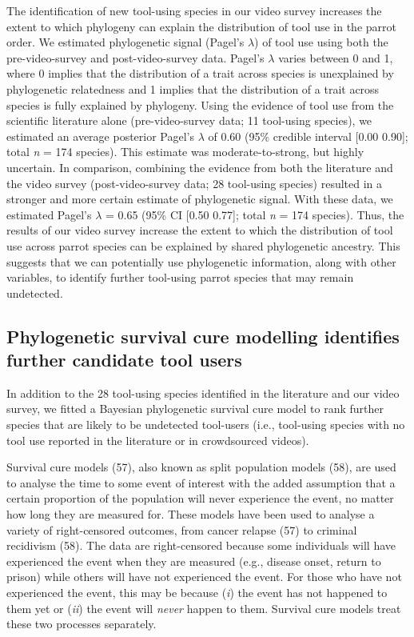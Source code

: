 \documentclass[
  man, donotrepeattitle,floatsintext]{apa6}
\begin{document}
The identification of new tool-using species in our video survey increases the
extent to which phylogeny can explain the distribution of tool use in the parrot
order. We estimated phylogenetic signal (Pagel's \(\lambda\)) of tool use using
both the pre-video-survey and post-video-survey data. Pagel's \(\lambda\) varies
between 0 and 1, where 0 implies that the distribution of a trait across species
is unexplained by phylogenetic relatedness and 1 implies that the distribution
of a trait across species is fully explained by phylogeny. Using the evidence of
tool use from the scientific literature alone (pre-video-survey data; 11
tool-using species), we estimated an average posterior Pagel's \(\lambda\) of
0.60 (95\% credible interval {[}0.00
0.90{]}; total \emph{n} =
174 species). This estimate was moderate-to-strong, but highly
uncertain. In comparison, combining the evidence from both the literature and
the video survey (post-video-survey data; 28 tool-using species) resulted in a
stronger and more certain estimate of phylogenetic signal. With these data, we
estimated Pagel's \(\lambda\) = 0.65 (95\% CI
{[}0.50
0.77{]}; total \emph{n} =
174 species). Thus, the results of our video survey increase
the extent to which the distribution of tool use across parrot species can be
explained by shared phylogenetic ancestry. This suggests that we can potentially
use phylogenetic information, along with other variables, to identify further
tool-using parrot species that may remain undetected.

\hypertarget{phylogenetic-survival-cure-modelling-identifies-further-candidate-tool-users}{%
\subsection{Phylogenetic survival cure modelling identifies further candidate tool users}\label{phylogenetic-survival-cure-modelling-identifies-further-candidate-tool-users}}

In addition to the 28 tool-using species identified in the literature and our
video survey, we fitted a Bayesian phylogenetic survival cure model to rank
further species that are likely to be undetected tool-users (i.e., tool-using
species with no tool use reported in the literature or in crowdsourced videos).

Survival cure models (57), also known as split population
models (58), are used to analyse the time to some event of interest
with the added assumption that a certain proportion of the population will never
experience the event, no matter how long they are measured for. These models
have been used to analyse a variety of right-censored outcomes, from cancer
relapse (57) to criminal recidivism (58). The data are
right-censored because some individuals will have experienced the event when
they are measured (e.g., disease onset, return to prison) while others will have
not experienced the event. For those who have not experienced the event, this
may be because (\emph{i}) the event has not happened to them yet or (\emph{ii}) the event
will \emph{never} happen to them. Survival cure models treat these two processes
separately.
\end{document}
